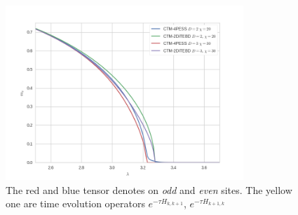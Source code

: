 \begin{figure}[H]
	\centering
	\includegraphics[width=0.80\textwidth]{figures/ctm_pess.png}
	\caption[The picture of the main idea of itebd.]{The red and blue tensor denotes on \textit{odd} and \textit{even} sites. The yellow one are time evolution operators $e^{-\tau H_{k,k+1}}$, $e^{-\tau H_{k+1,k}}$}
	\label{fig523}
\end{figure}


